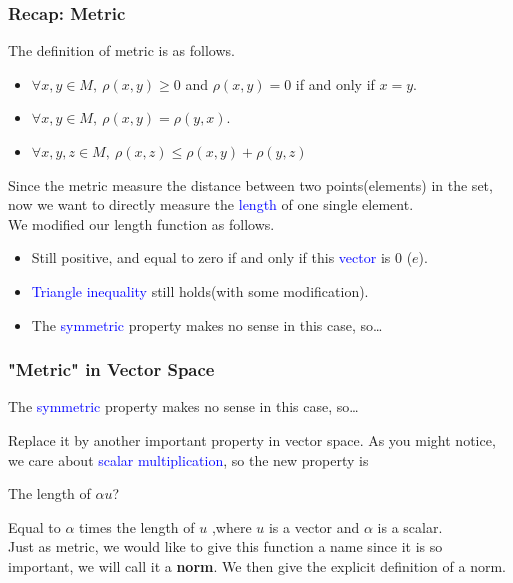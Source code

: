 \documentclass{beamer}
\begin{document}
\begin{frame}
    \frametitle{Recap: Metric}
    The definition of metric is as follows.
    \vspace{1em}
    \begin{itemize}
        \item $\forall x,y\in M,\ \rho (x,y) \geq 0$ and $\rho (x,y)=0$ if and only if $x=y$.
        \item  $\forall x,y\in M,\ \rho (x,y)=\rho (y,x)$.
        \item  $\forall x,y,z\in M,\ \rho (x,z)\leq \rho (x,y)+\rho (y,z)$
    \end{itemize}
    \hspace{1em}
    Since the metric measure the distance between two points(elements) in the set, now we want to directly measure the \textcolor{blue}{length} of one single element.\\
    \vspace{1em}
    \hspace{1em}
    We modified our length function as follows.
    \begin{itemize}
        \item Still positive, and equal to zero if and only if this \textcolor{blue}{vector} is 0 ($e$).
        \item \textcolor{blue}{Triangle inequality} still holds(with some modification).
        \item The \textcolor{blue}{symmetric} property makes no sense in this case, so\dots
    \end{itemize}

\end{frame}
\begin{frame}
    \frametitle{"Metric" in Vector Space}
    \begin{center}
        \hspace{1em} The \textcolor{blue}{symmetric} property makes no sense in this case, so\dots
    \end{center}

    \hspace{1em}Replace it by another important property in vector space. As you might notice, we care about \textcolor{blue}{scalar multiplication}, so the new property is
    \begin{center}
        The length of $\alpha u$?
    \end{center}

    \hspace{1em}Equal to $\alpha$ times the length of $u$
    ,where $u$ is a vector and $\alpha$ is a scalar. \\ \vspace{0.5em}\hspace{1em}Just as metric, we would like to give this function a name since it is so important,
    we will call it a \textbf{norm}. We then give the explicit definition of a norm.
\end{frame}
\end{document}
